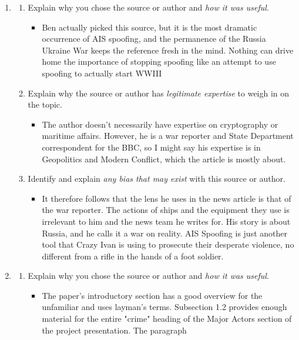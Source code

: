 \documentclass[12pt]{texMemo} %
\begin{document}
\begin{enumerate}
\begin{enumerate}
\begin{itemize}
        \end{itemize}
\end{enumerate}
    \item {}
    \begin{enumerate}
    \item Explain why you chose the source or author and \emph{how it was useful}.
        \begin{itemize}
            \item Ben actually picked this source, but it is the most dramatic occurrence of AIS spoofing, and the permanence of the Russia Ukraine War keeps the reference fresh in the mind. Nothing can drive home the importance of stopping spoofing like an attempt to use spoofing to actually start WWIII
        \end{itemize}
    \item Explain why the source or author has \emph{legitimate expertise} to weigh in on the topic.
        \begin{itemize}
            \item The author doesn't necessarily have expertise on cryptography or maritime affairs. However, he is a war reporter and State Department correspondent for the BBC, so I might say his expertise is in Geopolitics and Modern Conflict, which the article is mostly about.
        \end{itemize}
    \item Identify and explain \emph{any bias that may exist} with this source or author.
        \begin{itemize}
            \item It therefore follows that the lens he uses in the news article is that of the war reporter. The actions of ships and the equipment they use is irrelevant to him and the news team he writes for. His story is about Russia, and he calls it a war on reality. AIS Spoofing is just another tool that Crazy Ivan is using to prosecute their desperate violence, no different from a rifle in the hands of a foot soldier. 
        \end{itemize}
\end{enumerate}
 \item {}
    \begin{enumerate}
    \item Explain why you chose the source or author and \emph{how it was useful}.
        \begin{itemize}
            \item The paper's introductory section has a good overview for the unfamiliar and uses layman's terms. Subsection 1.2 provides enough material for the entire "crime" heading of the Major Actors section of the project presentation. The paragraph \begin{quote}

\end{quote}
\end{itemize}
\end{enumerate}
\end{enumerate}
\end{document}
